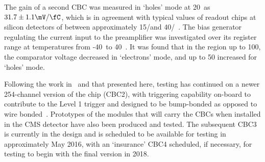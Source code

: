 The gain of a second CBC was measured in `holes' mode at 20~\degreeCelsius as $31.7\pm1.1\mV/\fC$, which is in
agreement with typical values of readout chips at silicon detectors of between approximately 15\mV/\fC and
40\mV/\fC~\cite{Kaplon:2001jh}. The bias generator regulating the current input to the preamplifier was
investigated over its register range at temperatures from -40~\degreeCelsius to 40~\degreeCelsius. It was
found that in the region up to 100\uA, the comparator voltage decreased in `electrons' mode, and up to 50\uA
increased for `holes' mode.

Following the work in~\cite{JacobJA} and that presented here, testing has continued on a newer 254-channel
version of the chip (CBC2), with triggering capability on-board to contribute to the Level 1 trigger and
designed to be bump-bonded as opposed to wire bonded~\cite{Klein:1628930,Abbaneo:1452189}.
Prototypes of the modules that will carry the CBCs when installed in the CMS detector have also been produced
and tested. The subsequent CBC3 is currently in the design and is scheduled to be available for testing in
approximately May 2016, with an `insurance' CBC4 scheduled, if necessary, for testing to begin with the final
version in 2018.
